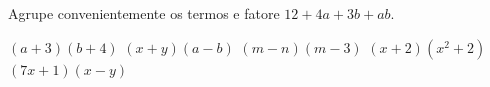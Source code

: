Agrupe convenientemente os termos e fatore $12+4a+3b+ab$.

$(a+3)(b+4)$
$(x+y)(a-b)$
$(m-n)(m-3)$
$(x+2)(x^2+2)$
$(7x+1)(x-y)$


